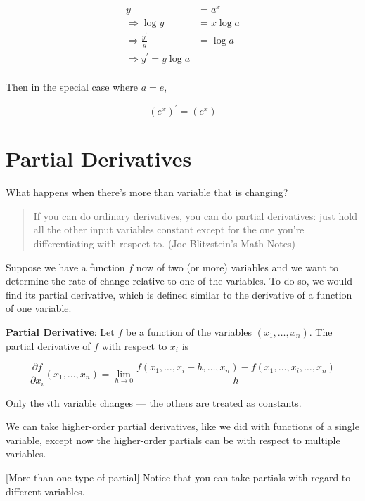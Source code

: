 \documentclass[]{book}
\theoremstyle{definition}
\theoremstyle{definition}
\theoremstyle{definition}
\theoremstyle{remark}
\begin{document}
\begin{align*}
y &= a^x \\
\Rightarrow \log y &= x \log a\\
\Rightarrow \frac{y^\prime}{y} &= \log a\\
\Rightarrow  y^\prime = y \log a\\
\end{align*}

Then in the special case where \(a = e\),

\[(e^x)^\prime = (e^x)\]

\hypertarget{partial-derivatives}{%
\section{Partial Derivatives}\label{partial-derivatives}}

What happens when there's more than variable that is changing?

\begin{quote}
If you can do ordinary derivatives, you can do partial derivatives: just hold all the other input variables constant except for the one you're differentiating with respect to. (Joe Blitzstein's Math Notes)
\end{quote}

Suppose we have a function \(f\) now of two (or more) variables and we want to determine the rate of change relative to one of the variables. To do so, we would find its partial derivative, which is defined similar to the derivative of a function of one variable.

\textbf{Partial Derivative}: Let \(f\) be a function of the variables \((x_1,\ldots,x_n)\). The partial derivative of \(f\) with respect to \(x_i\) is

\[\frac{\partial f}{\partial x_i} (x_1,\ldots,x_n) = \lim\limits_{h\to 0} \frac{f(x_1,\ldots,x_i+h,\ldots,x_n)-f(x_1,\ldots,x_i,\ldots,x_n)}{h}\]

Only the \(i\)th variable changes --- the others are treated as constants.

We can take higher-order partial derivatives, like we did with functions of a single variable, except now the higher-order partials can be with respect to multiple variables.

[More than one type of partial]
\protect\hypertarget{exm:unnamed-chunk-18}{}{\label{exm:unnamed-chunk-18} {} }Notice that you can take partials with regard to different variables.
\end{document}
